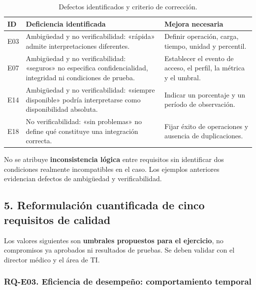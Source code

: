 \documentclass[12pt,a4paper]{article}
\begin{document}
\begin{table}[H]
\centering
\small
\begin{tabularx}{\textwidth}{|l|X|X|}
\hline
\textbf{ID} & \textbf{Deficiencia identificada} & \textbf{Mejora necesaria} \\ \hline

E03 &
Ambigüedad y no verificabilidad: «rápida» admite interpretaciones diferentes. &
Definir operación, carga, tiempo, unidad y percentil. \\ \hline

E07 &
Ambigüedad y no verificabilidad: «seguros» no especifica confidencialidad, integridad ni condiciones de prueba. &
Establecer el evento de acceso, el perfil, la métrica y el umbral. \\ \hline

E14 &
Ambigüedad y no verificabilidad: «siempre disponible» podría interpretarse como disponibilidad absoluta. &
Indicar un porcentaje y un período de observación. \\ \hline

E18 &
No verificabilidad: «sin problemas» no define qué constituye una integración correcta. &
Fijar éxito de operaciones y ausencia de duplicaciones. \\ \hline

\end{tabularx}
\caption{Defectos identificados y criterio de corrección.}
\end{table}

No se atribuye \textbf{inconsistencia lógica} entre requisitos sin identificar dos condiciones realmente incompatibles en el caso. Los ejemplos anteriores evidencian defectos de ambigüedad y verificabilidad.


\subsection*{5. Reformulación cuantificada de cinco requisitos de calidad}

Los valores siguientes son \textbf{umbrales propuestos para el ejercicio}, no compromisos ya aprobados ni resultados de pruebas. Se deben validar con el director médico y el área de TI.

\subsubsection*{RQ-E03. Eficiencia de desempeño: comportamiento temporal}
\end{document}
